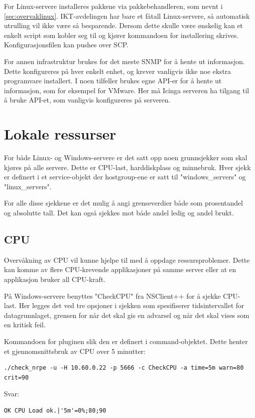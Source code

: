 For Linux-servere installeres pakkene via pakkebehandleren, som nevnt i \ref{sec:overvaklinux}. IKT-avdelingen har bare et fåtall Linux-servere, så automatisk utrulling vil ikke være så besparende. Dersom dette skulle være ønskelig kan et enkelt script som kobler seg til og kjører kommandoen for installering skrives. Konfigurasjonsfilen kan pushes over SCP.

For annen infrastruktur brukes for det meste SNMP for å hente ut informasjon. Dette konfigureres på hver enkelt enhet, og krever vanligvis ikke noe ekstra programvare installert. I noen tilfeller brukes egne API-er for å hente ut informasjon, som for eksempel for VMware. Her må Icinga serveren ha tilgang til å bruke API-et, som vanligvis konfigureres på serveren.

\section{Lokale ressurser}
For både Linux- og Windows-servere er det satt opp noen grunnsjekker som skal kjøres på alle servere. Dette er CPU-last, harddiskplass og minnebruk. Hver sjekk er definert i et service-objekt der hostgroup-ene er satt til "windows\_servers" og "linux\_servers". 

For alle disse sjekkene er det mulig å angi grenseverdier både som prosentandel og absolutte tall. Det kan også sjekkes mot både andel ledig og andel brukt. 
\subsection{CPU}
Overvåkning av CPU vil kunne hjelpe til med å oppdage ressursproblemer. Dette kan komme av flere CPU-krevende applikasjoner på samme server eller at en applikasjon bruker all CPU-kraft.  

På Windows-servere benyttes "CheckCPU" fra NSClient++ for å sjekke CPU-last. Her legges det ved tre opsjoner i sjekken som spesifiserer tidsintervallet for datagrunnlaget, grensen for når det skal gis en advarsel og når det skal vises som en kritisk feil.

Kommandoen for pluginen slik den er definert i command-objektet. Dette henter et gjennomsnittsbruk av CPU over 5 minutter: 

\begin{lstlisting}[style=example]
./check_nrpe -u -H 10.60.0.22 -p 5666 -c CheckCPU -a time=5m warn=80 crit=90
\end{lstlisting}
Svar:
\begin{lstlisting}[style=example]
OK CPU Load ok.|'5m'=0%;80;90
\end{lstlisting}

